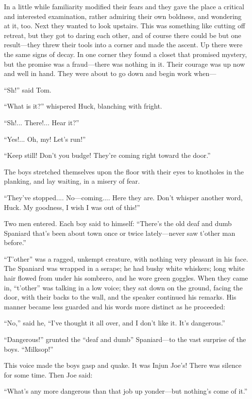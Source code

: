 \documentclass{book}
\begin{document}
In a little while familiarity modified their fears and they gave the place a critical and interested examination, rather admiring their own boldness, and wondering at it, too. Next they wanted to look upstairs. This was something like cutting off retreat, but they got to daring each other, and of course there could be but one result—they threw their tools into a corner and made the ascent. Up there were the same signs of decay. In one corner they found a closet that promised mystery, but the promise was a fraud—there was nothing in it. Their courage was up now and well in hand. They were about to go down and begin work when—

“Sh!” said Tom.

“What is it?” whispered Huck, blanching with fright.

“Sh!... There!... Hear it?”

“Yes!... Oh, my! Let’s run!”

“Keep still! Don’t you budge! They’re coming right toward the door.”

The boys stretched themselves upon the floor with their eyes to knotholes in the planking, and lay waiting, in a misery of fear.

“They’ve stopped.... No—coming.... Here they are. Don’t whisper another word, Huck. My goodness, I wish I was out of this!”

Two men entered. Each boy said to himself: “There’s the old deaf and dumb Spaniard that’s been about town once or twice lately—never saw t’other man before.”

“T’other” was a ragged, unkempt creature, with nothing very pleasant in his face. The Spaniard was wrapped in a serape; he had bushy white whiskers; long white hair flowed from under his sombrero, and he wore green goggles. When they came in, “t’other” was talking in a low voice; they sat down on the ground, facing the door, with their backs to the wall, and the speaker continued his remarks. His manner became less guarded and his words more distinct as he proceeded:

“No,” said he, “I’ve thought it all over, and I don’t like it. It’s dangerous.”

“Dangerous!” grunted the “deaf and dumb” Spaniard—to the vast surprise of the boys. “Milksop!”

This voice made the boys gasp and quake. It was Injun Joe’s! There was silence for some time. Then Joe said:

“What’s any more dangerous than that job up yonder—but nothing’s come of it.”
\end{document}
